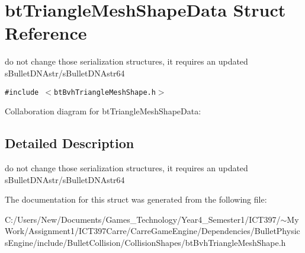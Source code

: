 \hypertarget{structbt_triangle_mesh_shape_data}{
\section{btTriangleMeshShapeData Struct Reference}
\label{structbt_triangle_mesh_shape_data}
}
do not change those serialization structures, it requires an updated sBulletDNAstr/sBulletDNAstr64  


{\tt \#include $<$btBvhTriangleMeshShape.h$>$}

Collaboration diagram for btTriangleMeshShapeData:

\subsection{Detailed Description}
do not change those serialization structures, it requires an updated sBulletDNAstr/sBulletDNAstr64 

The documentation for this struct was generated from the following file:\begin{CompactItemize}
\item 
C:/Users/New/Documents/Games\_\-Technology/Year4\_\-Semester1/ICT397/$\sim$My Work/Assignment1/ICT397Carre/CarreGameEngine/Dependencies/BulletPhysicsEngine/include/BulletCollision/CollisionShapes/btBvhTriangleMeshShape.h\end{CompactItemize}
